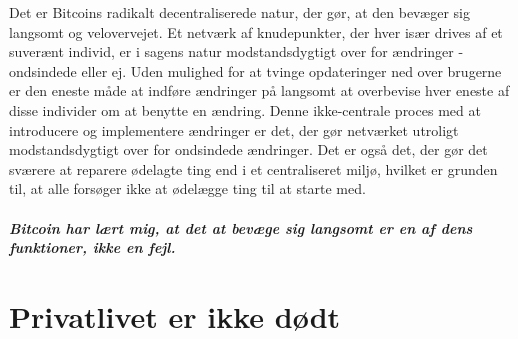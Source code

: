 \documentclass[paper=6in:9in,pagesize=pdftex,headinclude=on,footinclude=on,12pt]{scrbook}
\begin{document}
Det er Bitcoins radikalt decentraliserede natur, der gør, at den bevæger sig langsomt og velovervejet. Et netværk af knudepunkter, der hver især drives af et suverænt individ, er i sagens natur modstandsdygtigt over for ændringer - ondsindede eller ej. Uden mulighed for at tvinge opdateringer ned over brugerne er den eneste måde at indføre ændringer på langsomt at overbevise hver eneste af disse individer om at benytte en ændring. Denne ikke-centrale proces med at introducere og implementere ændringer er det, der gør netværket utroligt modstandsdygtigt over for ondsindede ændringer. Det er også det, der gør det sværere at reparere ødelagte ting end i et centraliseret miljø, hvilket er grunden til, at alle forsøger ikke at ødelægge ting til at starte med.\paragraph{Bitcoin har lært mig, at det at bevæge sig langsomt er en af dens funktioner, ikke en fejl.}%
%
%
%
%
%
%
%

\chapter{Privatlivet er ikke dødt}
\label{les:19}
\end{document}
